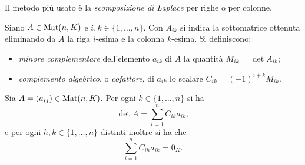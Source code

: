 Il metodo più usato è la \emph{scomposizione di Laplace} per righe o per colonne.
\begin{definizione} \label{d:minori-complementi}
	Siano $A\in\operatorname{Mat}(n,K)$ e $i,k\in\{1,\dots,n\}$.
	Con $A_{ik}$ si indica la sottomatrice ottenuta eliminando da $A$ la riga $i$-esima e la colonna $k$-esima.
	Si definiscono:
	\begin{itemize}
		\item \emph{minore complementare} dell'elemento $a_{ik}$ di $A$ la quantità $M_{ik}=\det A_{ik}$;
		\item \emph{complemento algebrico}, o \emph{cofattore}, di $a_{ik}$ lo scalare $C_{ik}=(-1)^{i+k}M_{ik}$.
	\end{itemize}
\end{definizione}
\begin{teorema}[di Laplace] \label{t:sviluppo-laplace}
	Sia $A=(a_{ij})\in\operatorname{Mat}(n,K)$.
	Per ogni $k\in\{1,\dots,n\}$ si ha
	\begin{equation} \label{eq:det-laplace1}
		\det A=\sum_{i=1}^nC_{ik}a_{ik},
	\end{equation}
	e per ogni $h,k\in\{1,\dots,n\}$ distinti inoltre si ha che
	\begin{equation} \label{eq:det-laplace2}
		\sum_{i=1}^nC_{ih}a_{ik}=0_K.
	\end{equation}
\end{teorema}

